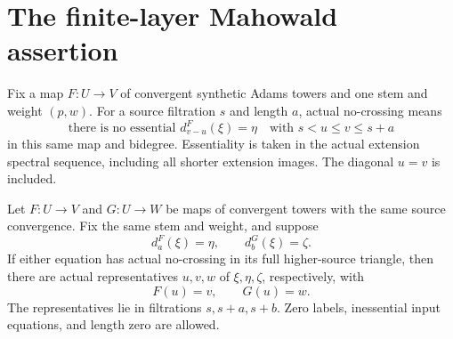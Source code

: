 \section{The finite-layer Mahowald assertion}

\begin{definition}
\label{sem:ProofTools:mh-actual-no-crossing}
Fix a map $F:U\to V$ of convergent synthetic Adams towers and one stem and weight $(p,w)$. For a source filtration $s$ and length $a$, actual no-crossing means
\[
\text{there is no essential }d_{v-u}^{F}(\xi)=\eta
\quad\text{with }s<u\leq v\leq s+a
\]
in this same map and bidegree. Essentiality is taken in the actual extension spectral sequence, including all shorter extension images. The diagonal $u=v$ is included.
\end{definition}

\begin{theorem}
\label{sem:ProofTools:mh-common-source}
Let $F:U\to V$ and $G:U\to W$ be maps of convergent towers with the same source convergence. Fix the same stem and weight, and suppose
\[
d_a^F(\xi)=\eta,\qquad d_b^G(\xi)=\zeta.
\]
If either equation has actual no-crossing in its full higher-source triangle, then there are actual representatives $u,v,w$ of $\xi,\eta,\zeta$, respectively, with
\[F(u)=v,\qquad G(u)=w.\]
The representatives lie in filtrations $s,s+a,s+b$. Zero labels, inessential input equations, and length zero are allowed.
\end{theorem}

